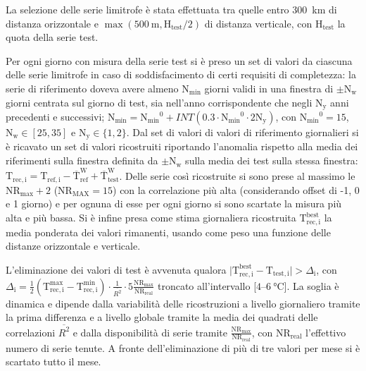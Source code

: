 La selezione delle serie limitrofe è stata effettuata tra quelle entro \qty{300}{\kilo\meter} di distanza orizzontale e \(\max(\qty{500}{\meter}, \mathrm{H_{test}}/2)\) di distanza verticale, con \(\mathrm{H_{test}}\) la quota della serie test.

Per ogni giorno con misura della serie test si è preso un set di valori da ciascuna delle serie limitrofe in caso di soddisfacimento di certi requisiti di completezza: la serie di riferimento doveva avere almeno \(\mathrm{N_{min}}\) giorni validi in una finestra di \(\pm\mathrm{N_w}\) giorni centrata sul giorno di test, sia nell'anno corrispondente che negli \(\mathrm{N_y}\) anni precedenti e successivi; \(\mathrm{N_{min}} = \mathrm{N_{min}}^0 + INT(0.3\cdot\mathrm{N_{min}}^0\cdot2\mathrm{N_y})\), con \(\mathrm{N_{min}}^0 = 15\), \(\mathrm{N_w} \in [25, 35]\) e \(\mathrm{N_y} \in \{1, 2\} \). Dal set di valori di valori di riferimento giornalieri si è ricavato un set di valori ricostruiti riportando l'anomalia rispetto alla media dei riferimenti sulla finestra definita da \(\pm \mathrm{N_w}\) sulla media dei test sulla stessa finestra: \(\mathrm{T_{rec,i}} = \mathrm{T_{ref,i}} - \mathrm{\overline{T}_{ref}^W} + \mathrm{\overline{T}_{test}^W}\). Delle serie così ricostruite si sono prese al massimo le \(\mathrm{NR_{max}} + 2\) (\(\mathrm{NR_{MAX}} = 15\)) con la correlazione più alta (considerando offset di -1, 0 e 1 giorno) e per ognuna di esse per ogni giorno si sono scartate la misura più alta e più bassa. Si è infine presa come stima giornaliera ricostruita \(\mathrm{T_{rec,i}^{best}}\) la media ponderata dei valori rimanenti, usando come peso una funzione delle distanze orizzontale e verticale.

L'eliminazione dei valori di test è avvenuta qualora \(\lvert \mathrm{T_{rec,i}^{best}} - \mathrm{T_{test,i}} \rvert > \Delta_\mathrm{i}\), con \(\Delta_\mathrm{i} = \frac{1}{2}(\mathrm{T_{rec,i}^{max} - T_{rec,i}^{min}})\cdot\frac{1}{\overline{R^2}}\cdot5\frac{\mathrm{NR_{max}}}{\mathrm{NR_{real}}}\) troncato all'intervallo [\(\num{4}\)--\(\qty{6}{\degreeCelsius}\)]. La soglia è dinamica e dipende dalla variabilità delle ricostruzioni a livello giornaliero tramite la prima differenza e a livello globale tramite la media dei quadrati delle correlazioni \(\overline{R^2}\) e dalla disponibilità di serie tramite \(\frac{\mathrm{NR_{max}}}{\mathrm{NR_{real}}}\), con \(\mathrm{NR_{real}}\) l'effettivo numero di serie tenute. A fronte dell'eliminazione di più di tre valori per mese si è scartato tutto il mese.